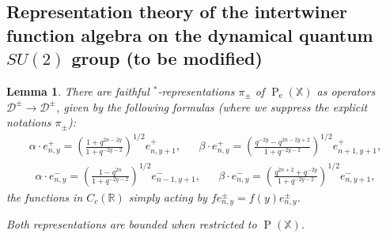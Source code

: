 \documentclass[12pt]{article}
\theoremstyle{change}
\DeclareMathOperator{\ext}{\mathrm{e}}
\DeclareMathOperator{\Pol}{\mathrm{P}}
\DeclareMathOperator{\sgn}{\mathrm{sgn}}
\newcommand{\R}{\mathbb{R}}
\newcommand{\Z}{\mathbb{Z}}
\newcommand{\X}{\mathbb{X}}
\newcommand{\Hilb}{\mathrm{Hilb}}
\newcommand{\Rep}{\mathrm{Rep}}
\newtheorem{Lem}[Theorem]{Lemma}
\theoremstyle{definition}
\numberwithin{equation}{section}
\begin{document}








\subsection{Representation theory of the intertwiner function algebra on the dynamical quantum $SU(2)$ group (to be modified)}

\begin{Lem} There are faithful $^*$-representations $\pi_{\pm}$ of $\Pol_{\ext}(\X)$ as operators $\mathscr{D}^{\pm}\rightarrow \mathscr{D}^{\pm}$, given by the following formulas (where we suppress the explicit notations $\pi_{\pm}$): \begin{align*} \alpha\cdot e_{n,y}^+ = \left(\frac{1+q^{2n-2y}}{1+q^{-2y-2}}\right)^{1/2}e_{n,y+1}^+,&& \beta\cdot e_{n,y}^+ = \left(\frac{q^{-2y}-q^{2n-2y+2}}{1+q^{-2y-2}}\right)^{1/2}e_{n+1,y+1}^+,\end{align*}
\begin{align*} \alpha\cdot e_{n,y}^- = \left(\frac{1-q^{2n}}{1+q^{-2y-2}}\right)^{1/2}e_{n-1,y+1}^-,&& \beta\cdot e_{n,y}^- = \left(\frac{q^{2n+2}+q^{-2y}}{1+q^{-2y-2}}\right)^{1/2}e_{n,y+1}^-,\end{align*} the functions in $C_c(\R)$ simply acting by $fe_{n,y}^{\pm}= f(y)e_{n,y}^{\pm}$.

Both representations are bounded when restricted to $\Pol(\X)$.
\end{Lem}
\end{document}
